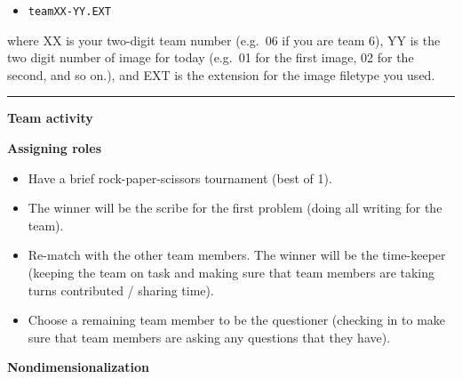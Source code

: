 \documentclass[12pt]{amsart}
\theoremstyle{conjecture}
\theoremstyle{definition}
\theoremstyle{question}
\theoremstyle{theorem}
\newcommand{\sectionrule}{%
    \vspace{0.3em}
    \hrule
    \vspace{0.8em}
}
\begin{document}
    \begin{itemize}
        \item \texttt{teamXX-YY.EXT}
    \end{itemize}

    where XX is your two-digit team number (e.g.\ 06 if you are team 6), YY is the two digit number of
    image for today (e.g.\ 01 for the first image, 02 for the second, and so on.), and EXT is the extension
    for the image filetype you used.

    \sectionrule

    {\LARGE\textbf{Team activity}}

    \vspace{0.7em}

    {\Large\textbf{Assigning roles}}

    \begin{itemize}
        \item Have a brief rock-paper-scissors tournament (best of 1).

        \item The winner will be the scribe for the first problem (doing all writing for the team).

        \item Re-match with the other team members. The winner will be the time-keeper (keeping the
        team on task and making sure that team members are taking turns contributed / sharing
        time).

        \item Choose a remaining team member to be the questioner (checking in to make sure that team
        members are asking any questions that they have).
    \end{itemize}

    \vspace{0.5em}

    \textbf{Nondimensionalization}
\end{document}
